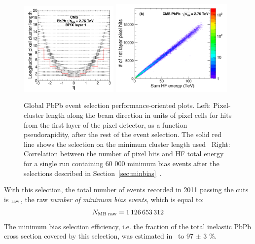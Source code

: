 \begin{figure}[!htb]
  \begin{center}
    \includegraphics[width=0.43\textwidth]{Chapters/xLHCMS/HIN_10_001_Fig2b.pdf}
    \includegraphics[width=0.53\textwidth]{Chapters/xLHCMS/PixelHits_vs_sumHFenergy_collisions.pdf}
    \caption{Global PbPb event selection performance-oriented
      plots. Left: Pixel-cluster length along the beam direction in
      units of pixel cells for hits from the first layer of the pixel
      detector, as a function pseudorapidity, after the rest of the
      event selection. The solid red line shows the selection on the
      minimum cluster length used~\cite{pbpbmult} Right: Correlation between the number of pixel
      hits and HF total energy for a single run containing 60 000 minimum
    bias events after the selections described in Section~\ref{sec:minbias}~\cite{Chatrchyan:2011sx}.} 
    \label{fig:eventselectioncuts}
  \end{center}
\end{figure}


With this selection, the total number of events recorded in 2011
passing the cuts is \NMB$_{\rm raw}$, the raw \textit{number of
  minimum bias events}, 
which is equal to: 
\begin{equation}
N_{\rm MB}\,_{\rm raw} =  1\,126\,653\,312
\end{equation}
The minimum bias selection efficiency, i.e. the fraction of the total
inelastic PbPb cross section covered by this selection, was estimated
in~\cite{Chatrchyan:2011sx} to 97 $\pm$ 3 \%.

